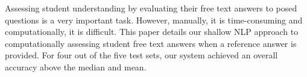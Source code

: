 Assessing student understanding by evaluating their free text answers to posed questions is a very important task. However, manually, it is time-consuming and
 computationally, it is difficult. This paper details our shallow NLP approach
 to computationally assessing student free text answers when a reference answer
 is provided. For four out of the five test sets, our system achieved an overall
 accuracy above the median and mean.

